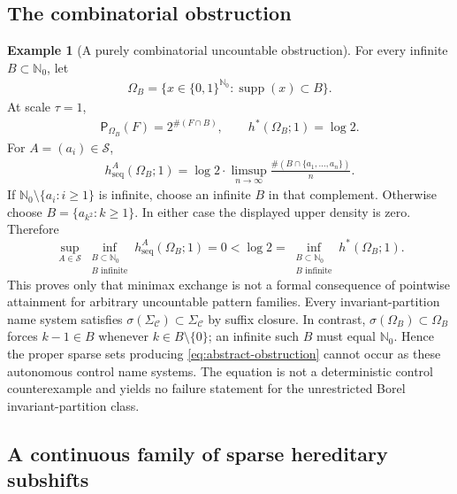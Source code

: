 \documentclass[11pt,reqno]{amsart}
\numberwithin{equation}{section}
\theoremstyle{definition}
\newtheorem{example}[theorem]{Example}
\theoremstyle{definition}
\newcommand{\Nzero}{\mathbb N_0}
\newcommand{\C}{\mathcal C}
\newcommand{\Patt}{\mathsf P}
\newcommand{\hseq}{h_{\mathrm{seq}}}
\newcommand{\hpat}{h^{*}}
\newcommand{\supp}{\operatorname{supp}}
\begin{document}
\subsection{The combinatorial obstruction}

\begin{example}[A purely combinatorial uncountable obstruction]
\label{ex:uncountable}
For every infinite $B\subset\Nzero$, let
\begin{align*}
 \Omega_B=\{x\in\{0,1\}^{\Nzero}:\supp(x)\subset B\}.
\end{align*}
At scale $\tau=1$,
\begin{align*}
 \Patt_{\Omega_B}(F)=2^{\#(F\cap B)},
 \qquad \hpat(\Omega_B;1)=\log2.
\end{align*}
For $A=(a_i)\in\mathscr S$,
\begin{align*}
 \hseq^A(\Omega_B;1)
 =\log2\cdot\limsup_{n\to\infty}
 \frac{\#(B\cap\{a_1,\ldots,a_n\})}{n}.
\end{align*}
If $\Nzero\setminus\{a_i:i\ge1\}$ is infinite, choose an infinite $B$ in that
complement.  Otherwise choose $B=\{a_{k^2}:k\ge1\}$.  In either case the
displayed upper density is zero.  Therefore
\begin{equation}\label{eq:abstract-obstruction}
 \sup_{A\in\mathscr S}
 \inf_{\substack{B\subset\Nzero\\B\text{ infinite}}}
 \hseq^A(\Omega_B;1)=0
 <\log2
 =\inf_{\substack{B\subset\Nzero\\B\text{ infinite}}}
 \hpat(\Omega_B;1).
\end{equation}
This proves only that minimax exchange is not a formal consequence of
pointwise attainment for arbitrary uncountable pattern families.  Every
invariant-partition name system satisfies
$\sigma(\Sigma_\C)\subset\Sigma_\C$ by suffix closure.  In contrast,
$\sigma(\Omega_B)\subset\Omega_B$ forces $k-1\in B$ whenever
$k\in B\setminus\{0\}$; an infinite such $B$ must equal $\Nzero$.  Hence the
proper sparse sets producing \eqref{eq:abstract-obstruction} cannot occur as
these autonomous control name systems.  The equation is not a deterministic
control counterexample and yields no failure statement for the unrestricted
Borel invariant-partition class.
\end{example}

\subsection{A continuous family of sparse hereditary subshifts}
\end{document}
